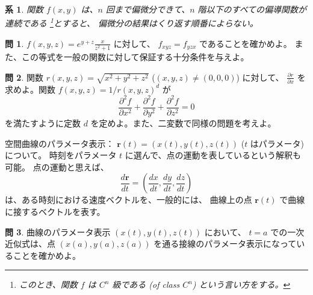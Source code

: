 \documentclass[a4paper]{jsarticle}
\newtheorem{Corollary}[Theorem]{系}
\theoremstyle{definition}
\newtheorem{Example}[Theorem]{例}
\newtheorem{Exercise}{問}%
\theoremstyle{remark}
\begin{document}
\begin{Corollary}
関数 $f(x,y)$ は、$n$ 回まで偏微分できて、$n$ 階以下のすべての偏導関数が連続である
\footnote{このとき、関数 $f$ は $C^n$ 級である (of class $C^n$) という言い方をする。}とすると、
偏微分の結果はくり返す順番によらない。
\end{Corollary}


\begin{Exercise}
$f(x,y,z) = e^{y+z}\frac{x}{z^2+1}$ に対して、
$f_{xyz} = f_{yzx}$ であることを確かめよ。
また、この等式を一般の関数に対して保証する十分条件を与えよ。
\end{Exercise}

\begin{Exercise}
関数 $r(x,y,z) = \sqrt{x^2+y^2+z^2}$ ($(x,y,z) \not= (0,0,0)$) に対して、
$\displaystyle \frac{\partial r}{\partial x}$
を求めよ。関数 $f(x,y,z) = 1/r(x,y,z)^d$ が
\[
\frac{\partial^2 f}{\partial x^2}
+ \frac{\partial^2 f}{\partial y^2}
+ \frac{\partial^2 f}{\partial z^2} = 0
\]
を満たすように定数 $d$ を定めよ。また、二変数で同様の問題を考えよ。
\end{Exercise} 


\bigskip
空間曲線のパラメータ表示：
$\bm{r}(t) = (x(t),y(t),z(t))$ ($t$ はパラメータ)について。
時刻をパラメータ $t$ に選んで、点の運動を表しているという解釈も可能。
点の運動と思えば、
\[
\frac{d\bm{r}}{dt} = \left(\frac{dx}{dt},\frac{dy}{dt},\frac{dz}{dt}\right) 
\]
は、ある時刻における速度ベクトルを、一般的には、
曲線上の点 $\bm{r}(t)$ で曲線に接するベクトルを表す。

\begin{Exercise}
曲線のパラメータ表示 $(x(t),y(t),z(t))$ において、
$t=a$ での一次近似式は、点 $(x(a),y(a),z(a))$ を通る接線のパラメータ表示になっていることを確かめよ。
\end{Exercise}
\end{document}
